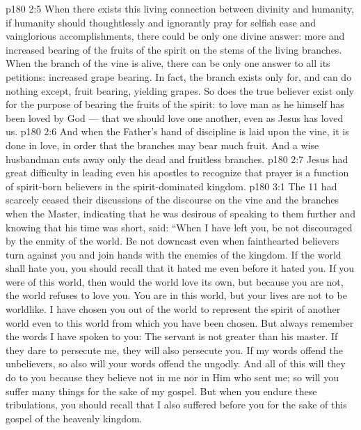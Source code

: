 \vs p180 2:5 When there exists this living connection between divinity and humanity, if humanity should thoughtlessly and ignorantly pray for selfish ease and vainglorious accomplishments, there could be only one divine answer: more and increased bearing of the fruits of the spirit on the stems of the living branches. When the branch of the vine is alive, there can be only one answer to all its petitions: increased grape bearing. In fact, the branch exists only for, and can do nothing except, fruit bearing, yielding grapes. So does the true believer exist only for the purpose of bearing the fruits of the spirit: to love man as he himself has been loved by God --- that we should love one another, even as Jesus has loved us.
\vs p180 2:6 And when the Father’s hand of discipline is laid upon the vine, it is done in love, in order that the branches may bear much fruit. And a wise husbandman cuts away only the dead and fruitless branches.
\vs p180 2:7 Jesus had great difficulty in leading even his apostles to recognize that prayer is a function of spirit\hyp{}born believers in the spirit\hyp{}dominated kingdom.
\vs p180 3:1 The 11 had scarcely ceased their discussions of the discourse on the vine and the branches when the Master, indicating that he was desirous of speaking to them further and knowing that his time was short, said: “When I have left you, be not discouraged by the enmity of the world. Be not downcast even when fainthearted believers turn against you and join hands with the enemies of the kingdom. If the world shall hate you, you should recall that it hated me even before it hated you. If you were of this world, then would the world love its own, but because you are not, the world refuses to love you. You are in this world, but your lives are not to be worldlike. I have chosen you out of the world to represent the spirit of another world even to this world from which you have been chosen. But always remember the words I have spoken to you: The servant is not greater than his master. If they dare to persecute me, they will also persecute you. If my words offend the unbelievers, so also will your words offend the ungodly. And all of this will they do to you because they believe not in me nor in Him who sent me; so will you suffer many things for the sake of my gospel. But when you endure these tribulations, you should recall that I also suffered before you for the sake of this gospel of the heavenly kingdom.
